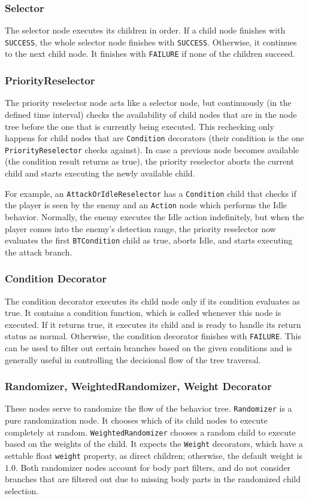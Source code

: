 \subsubsection{Selector}
The selector node executes its children in order. If a child node finishes with \texttt{SUCCESS}, the whole selector node finishes with \texttt{SUCCESS}. Otherwise, it continues to the next child node. It finishes with \texttt{FAILURE} if none of the children succeed.

\subsubsection{PriorityReselector}
The priority reselector node acts like a selector node, but continuously (in the defined time interval) checks the availability of child nodes that are in the node tree before the one that is currently being executed. This rechecking only happens for child nodes that are \texttt{Condition} decorators (their condition is the one \texttt{PriorityReselector} checks against). In case a previous node becomes available (the condition result returns as true), the priority reselector aborts the current child and starts executing the newly available child.

For example, an \texttt{AttackOrIdleReselector} has a \texttt{Condition} child that checks if the player is seen by the enemy and an \texttt{Action} node which performs the Idle behavior. Normally, the enemy executes the Idle action indefinitely, but when the player comes into the enemy's detection range, the priority reselector now evaluates the first \texttt{BTCondition} child as true, aborts Idle, and starts executing the attack branch.

\subsubsection{Condition Decorator}
The condition decorator executes its child node only if its condition evaluates as true. It contains a condition function, which is called whenever this node is executed. If it returns true, it executes its child and is ready to handle its return status as normal. Otherwise, the condition decorator finishes with \texttt{FAILURE}.
This can be used to filter out certain branches based on the given conditions and is generally useful in controlling the decisional flow of the tree traversal.

\subsubsection{Randomizer, WeightedRandomizer, Weight Decorator}
These nodes serve to randomize the flow of the behavior tree.
\texttt{Randomizer} is a pure randomization node. It chooses which of its child nodes to execute completely at random.
\texttt{WeightedRandomizer} chooses a random child to execute based on the weights of the child. It expects the \texttt{Weight} decorators, which have a settable float \texttt{weight} property, as direct children; otherwise, the default weight is $1.0$.
Both randomizer nodes account for body part filters, and do not consider branches that are filtered out due to missing body parts in the randomized child selection.

